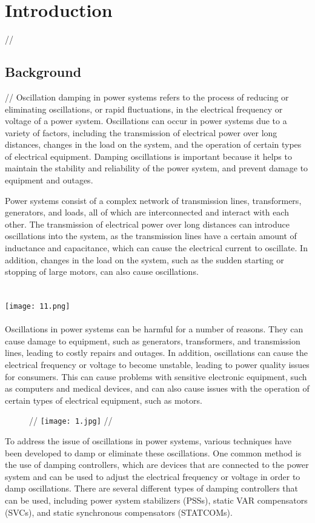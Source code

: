\documentclass[12pt]{article}
\begin{document}
\section{Introduction}//
\subsection{Background}//
Oscillation damping in power systems refers to the process of reducing or eliminating oscillations, or rapid fluctuations, in the electrical frequency or voltage of a power system. Oscillations can occur in power systems due to a variety of factors, including the transmission of electrical power over long distances, changes in the load on the system, and the operation of certain types of electrical equipment. Damping oscillations is important because it helps to maintain the stability and reliability of the power system, and prevent damage to equipment and outages.

Power systems consist of a complex network of transmission lines, transformers, generators, and loads, all of which are interconnected and interact with each other. The transmission of electrical power over long distances can introduce oscillations into the system, as the transmission lines have a certain amount of inductance and capacitance, which can cause the electrical current to oscillate. In addition, changes in the load on the system, such as the sudden starting or stopping of large motors, can also cause oscillations.\\
\\\\\texttt{[image: 11.png]}\\\\

Oscillations in power systems can be harmful for a number of reasons. They can cause damage to equipment, such as generators, transformers, and transmission lines, leading to costly repairs and outages. In addition, oscillations can cause the electrical frequency or voltage to become unstable, leading to power quality issues for consumers. This can cause problems with sensitive electronic equipment, such as computers and medical devices, and can also cause issues with the operation of certain types of electrical equipment, such as motors.\\
\begin{figure}[h]
\centering

//
\texttt{[image: 1.jpg]}
//


\end{figure}
To address the issue of oscillations in power systems, various techniques have been developed to damp or eliminate these oscillations. One common method is the use of damping controllers, which are devices that are connected to the power system and can be used to adjust the electrical frequency or voltage in order to damp oscillations. There are several different types of damping controllers that can be used, including power system stabilizers (PSSs), static VAR compensators (SVCs), and static synchronous compensators (STATCOMs).
\end{document}
